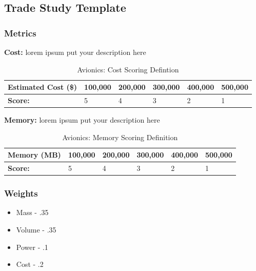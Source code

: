 \documentclass{ece}
\begin{document}
\subsection{Trade Study Template}
\subsubsection{Metrics}
\textbf{Cost:} lorem ipsum put your description here
\begin{table}[H]
\centering
\begin{tabular}{|l|l|l|l|l|l|} 
\hline
    \textbf{Estimated Cost (\$) } & 100,000 & 200,000 & 300,000 & 400,000 & 500,000
    \\
\hline
    \textbf{Score:} & 5 & 4 & 3 & 2 & 1
    \\
\hline
\end{tabular}
\caption{Avionics: Cost Scoring Defintion \cite{Boain}}
\label{tbl:avioniccost}
\end{table}

\textbf{Memory:} lorem ipsum put your description here
\begin{table}[H]
\centering
\begin{tabular}{|l|l|l|l|l|l|} 
\hline
    \textbf{Memory (MB) } & 100,000 & 200,000 & 300,000 & 400,000 & 500,000
    \\
\hline
    \textbf{Score:} & 5 & 4 & 3 & 2 & 1
    \\
\hline
\end{tabular}
\caption{Avionics: Memory Scoring Definition \cite{Boain}}
\label{tbl:avionicsmemory}
\end{table}

\subsubsection{Weights}

\begin{itemize}
    \item Mass - .35
    \item Volume - .35
    \item Power - .1
    \item Cost - .2
\end{itemize}
\end{document}
